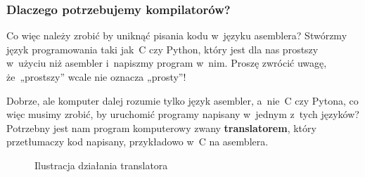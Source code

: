 \documentclass[10pt,t]{beamer}
\begin{document}
\begin{frame}
  \frametitle{Dlaczego potrzebujemy kompilatorów?}


  Co więc należy zrobić by uniknąć pisania kodu w~języku asemblera? Stwórzmy
  język programowania taki jak~C czy Python, który jest dla nas prostszy
  w~użyciu niż asembler i~napiszmy program w~nim. Proszę zwrócić uwagę,
  że~„prostszy” wcale nie oznacza \alert{„prosty”}!

  Dobrze, ale komputer dalej rozumie tylko język asembler, a~nie~C czy
  Pytona, co więc musimy zrobić, by uruchomić programy napisany w~jednym
  z~tych języków? Potrzebny jest nam program komputerowy zwany
  \textbf{translatorem}, który \alert{przetłumaczy} kod napisany,
  przykładowo w~C na asemblera.





  \begin{figure}

    \label{fig:Translator-01}


    \caption{Ilustracja działania translatora}


  \end{figure}





\end{frame}
\end{document}
